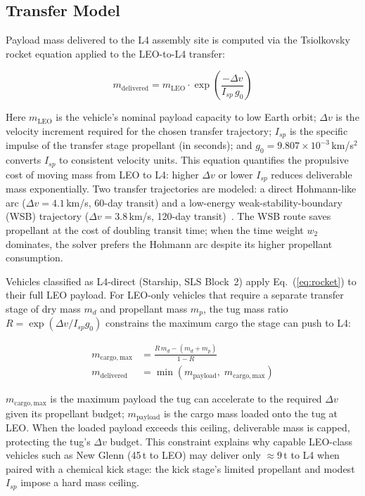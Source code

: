 \subsection{Transfer Model}

Payload mass delivered to the L4 assembly site is computed via the
Tsiolkovsky rocket equation applied to the LEO-to-L4 transfer:

\begin{equation}
  m_{\mathrm{delivered}} = m_{\mathrm{LEO}}
    \cdot \exp\!\left(\frac{-\Delta v}{I_{sp}\, g_0}\right)
  \label{eq:rocket}
\end{equation}

\noindent Here $m_{\mathrm{LEO}}$ is the vehicle's nominal payload
capacity to low Earth orbit;
$\Delta v$ is the velocity increment required for the chosen transfer
trajectory;
$I_{sp}$ is the specific impulse of the transfer stage propellant
(in seconds);
and $g_0 = 9.807 \times 10^{-3}$\,km/s$^2$ converts $I_{sp}$ to
consistent velocity units.
This equation quantifies the propulsive cost of moving mass from
LEO to L4: higher $\Delta v$ or lower $I_{sp}$ reduces deliverable
mass exponentially.
Two transfer trajectories are modeled: a direct Hohmann-like arc
($\Delta v = 4.1$\,km/s, 60-day transit) and a low-energy
weak-stability-boundary (WSB) trajectory ($\Delta v = 3.8$\,km/s,
120-day transit)~\cite{belbruno_wbs}.
The WSB route saves propellant at the cost of doubling transit time;
when the time weight $w_2$ dominates, the solver prefers the
Hohmann arc despite its higher propellant consumption.

Vehicles classified as L4-direct (Starship, SLS Block~2) apply
Eq.~(\ref{eq:rocket}) to their full LEO payload.
For LEO-only vehicles that require a separate transfer stage of
dry mass $m_d$ and propellant mass $m_p$, the tug mass ratio
$R = \exp(\Delta v / I_{sp} g_0)$ constrains the maximum cargo the
stage can push to L4:

\begin{align}
  m_{\mathrm{cargo,max}} &= \frac{R\,m_d - (m_d + m_p)}{1 - R}
  \label{eq:tug} \\
  m_{\mathrm{delivered}} &= \min\!\left(m_{\mathrm{payload}},\;
                               m_{\mathrm{cargo,max}}\right)
\end{align}

\noindent $m_{\mathrm{cargo,max}}$ is the maximum payload the tug
can accelerate to the required $\Delta v$ given its propellant budget;
$m_{\mathrm{payload}}$ is the cargo mass loaded onto the tug at LEO.
When the loaded payload exceeds this ceiling, deliverable mass is
capped, protecting the tug's $\Delta v$ budget.
This constraint explains why capable LEO-class vehicles such as
New Glenn (45\,t to LEO) may deliver only $\approx 9$\,t to L4
when paired with a chemical kick stage: the kick stage's limited
propellant and modest $I_{sp}$ impose a hard mass ceiling.

